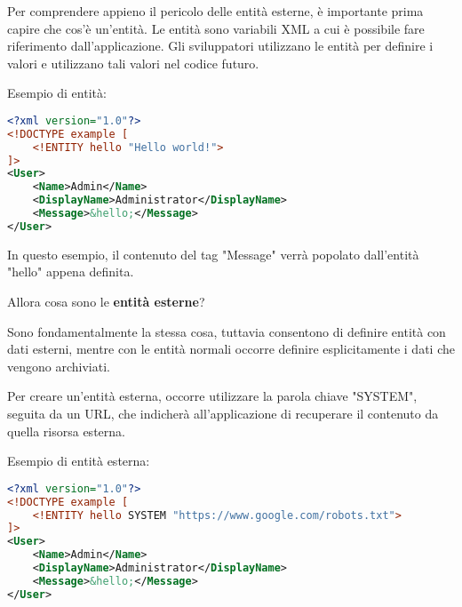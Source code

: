 \begin{flushleft}
Per comprendere appieno il pericolo delle entità esterne, è importante prima capire che cos'è un'entità. Le entità sono variabili XML a cui è possibile fare riferimento dall'applicazione. Gli sviluppatori utilizzano le entità per definire i valori e utilizzano tali valori nel codice futuro.
\end{flushleft}

\begin{flushleft}
Esempio di entità:
\end{flushleft}

\begin{lstlisting}[language=XML]
<?xml version="1.0"?>
<!DOCTYPE example [
    <!ENTITY hello "Hello world!">
]>
<User>
    <Name>Admin</Name>
    <DisplayName>Administrator</DisplayName>
    <Message>&hello;</Message>
</User>
\end{lstlisting}

\begin{flushleft}
In questo esempio, il contenuto del tag "Message" verrà popolato dall'entità "hello" appena definita.
\end{flushleft}

\begin{flushleft}
Allora cosa sono le \textbf{entità esterne}?
\end{flushleft}

\begin{flushleft}
Sono fondamentalmente la stessa cosa, tuttavia consentono di definire entità con dati esterni, mentre con le entità normali occorre definire esplicitamente i dati che vengono archiviati.
\end{flushleft}

\begin{flushleft}
Per creare un'entità esterna, occorre utilizzare la parola chiave "SYSTEM", seguita da un URL, che indicherà all'applicazione di recuperare il contenuto da quella risorsa esterna.
\end{flushleft}

\begin{flushleft}
Esempio di entità esterna:
\end{flushleft}

\begin{lstlisting}[language=XML]
<?xml version="1.0"?>
<!DOCTYPE example [
    <!ENTITY hello SYSTEM "https://www.google.com/robots.txt">
]>
<User>
    <Name>Admin</Name>
    <DisplayName>Administrator</DisplayName>
    <Message>&hello;</Message>
</User>
\end{lstlisting}

